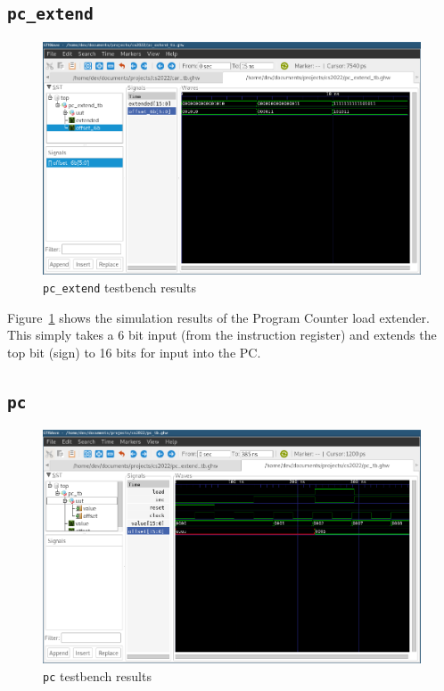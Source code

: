 \documentclass[a4paper]{article}
\numberwithin{figure}{section}
\numberwithin{table}{section}
\newcommand{\mi}{\mintinline}
\begin{document}
\newpage
\subsection{\mi{c}{pc_extend}}
\begin{figure}[h!]
	\centering
	\includegraphics[width=\textwidth]{pc_extend_tb}
	\caption{\mi{c}{pc_extend} testbench results}
	\label{fig:pcext}
\end{figure}

Figure~\ref{fig:pcext} shows the simulation results of the Program Counter load extender.
This simply takes a 6 bit input (from the instruction register) and extends the top bit (sign) to 16 bits for 
input into the PC.

\newpage
\subsection{\mi{c}{pc}}
\begin{figure}[h!]
	\centering
	\includegraphics[width=\textwidth]{pc_tb}
	\caption{\mi{c}{pc} testbench results}
	\label{fig:pc}
\end{figure}
\end{document}

